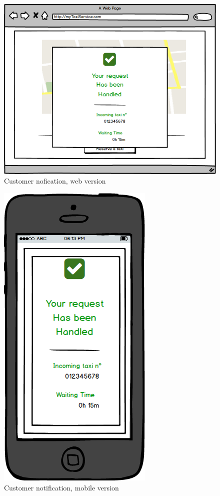 				\begin{figure}[H]
					\centering
					\includegraphics[scale=0.5]{IMG/UserInterfaces/customerNotification.png}
					\caption{Customer nofication, web version}\label{requestHandlded_w}
				\end{figure}
				\begin{figure}[H]
					\centering
					\includegraphics[scale=0.4]{IMG/UserInterfaces/customerNotification_m.png}
					\caption{Customer notification, mobile version}\label{requestHandled_m}
				\end{figure}
			
